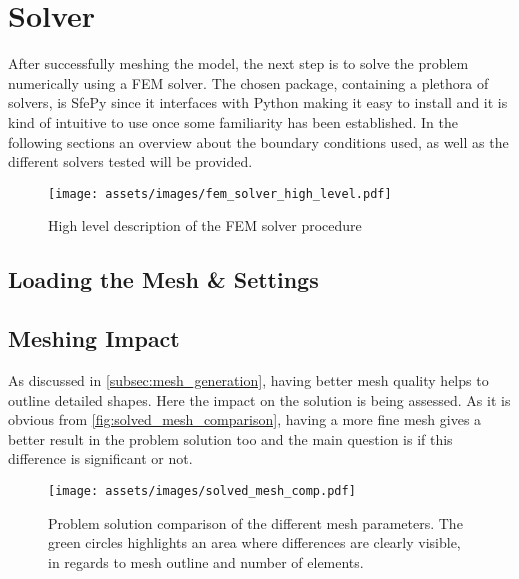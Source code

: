 \section{Solver}
\label{sec:fem_solver}

After successfully meshing the model, the next step is to solve the problem numerically using a \gls{FEM} solver. The chosen package, containing a plethora of solvers, is SfePy \cite{Cimrman2019} since it interfaces with Python making it easy to install and it is kind of intuitive to use once some familiarity has been established. In the following sections an overview about the boundary conditions used, as well as the different solvers tested will be provided.

\begin{figure}[H]
    \centering
    \texttt{[image: assets/images/fem\_solver\_high\_level.pdf]}
    \caption{High level description of the \gls{FEM} solver procedure}
    \label{fig:solver_high_level}
\end{figure}

\subsection{Loading the Mesh \& Settings}

\subsection{Meshing Impact}

As discussed in \ref{subsec:mesh_generation}, having better mesh quality helps to outline detailed shapes. Here the impact on the solution is being assessed. As it is obvious from \autoref{fig:solved_mesh_comparison}, having a more fine mesh gives a better result in the problem solution too and the main question is if this difference is significant or not.

\begin{figure}[H]
    \centering
    \texttt{[image: assets/images/solved\_mesh\_comp.pdf]}
    \caption[Problem solution comparison for the different $q$ mesh parameters.]{Problem solution comparison of the different mesh parameters. The green circles highlights an area where differences are clearly visible, in regards to mesh outline and number of elements.}
    \label{fig:solved_mesh_comparison}
\end{figure}

